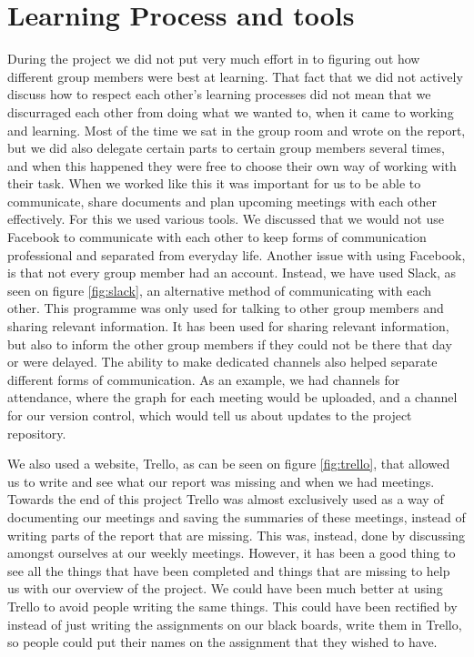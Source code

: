 \begin{figure}
	\centering
	
\end{figure}

\section{Learning Process and tools}
During the project we did not put very much effort in to figuring out how different group members were best at learning.
That fact that we did not actively discuss how to respect each other's learning processes did not mean that we discurraged each other from doing what we wanted to, when it came to working and learning.
Most of the time we sat in the group room and wrote on the report, but we did also delegate certain parts to certain group members several times, and when this happened they were free to choose their own way of working with their task.
When we worked like this it was important for us to be able to communicate, share documents and plan upcoming meetings with each other effectively.
For this we used various tools.
We discussed that we would not use Facebook to communicate with each other to keep forms of communication professional and separated from everyday life.
Another issue with using Facebook, is that not every group member had an account.
Instead, we have used Slack, as seen on figure \ref{fig:slack}, an alternative method of communicating with each other. 
This programme was only used for talking to other group members and sharing relevant information. 
It has been used for sharing relevant information, but also to inform the other group members if they could not be there that day or were delayed. 
The ability to make dedicated channels also helped separate different forms of communication. As an example, we had channels for attendance, where the graph for each meeting would be uploaded, and a channel for our version control, which would tell us about updates to the project repository.

We also used a website, Trello, as can be seen on figure \ref{fig:trello}, that allowed us to write and see what our report was missing and when we had meetings. 
Towards the end of this project Trello was almost exclusively used as a way of documenting our meetings and saving the summaries of these meetings, instead of writing parts of the report that are missing. 
This was, instead, done by discussing amongst ourselves at our weekly meetings.
However, it has been a good thing to see all the things that have been completed and things that are missing to help us with our overview of the project.
We could have been much better at using Trello to avoid people writing the same things.
This could have been rectified by instead of just writing the assignments on our black boards, write them in Trello, so people could put their names on the assignment that they wished to have.

